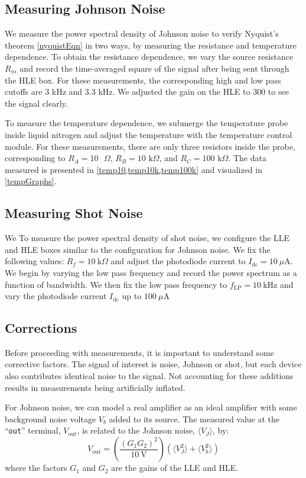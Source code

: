 \documentclass[12pt]{article}
\begin{document}
	\subsection{Measuring Johnson Noise}
	We measure the power spectral density of Johnson noise to verify Nyquist's theorem \cref{nyquistEqn} in two ways, by measuring the resistance and temperature dependence. To obtain the resistance dependence, we vary the source resistance $R_{in}$ and record the time-averaged square of the signal after being sent through the HLE box. For these measurements, the corresponding high and low pass cutoffs are $3$ kHz and $3.3$ kHz. We adjusted the gain on the HLE to 300 to see the signal clearly.
	
	To measure the temperature dependence, we submerge the temperature probe inside liquid nitrogen and adjust the temperature with the temperature control module. For these measurements, there are only three resistors inside the probe, corresponding to $R_A = 10 \text{ } \Omega$, $R_B = 10 \text{ k}\Omega$, and $R_C = 100 \text{ k}\Omega$. The data measured is presented in \cref{temp10,temp10k,temp100k} and visualized in \cref{tempGraphs}.
	
	\subsection{Measuring Shot Noise}
	We To measure the power spectral density of shot noise, we configure the LLE and HLE boxes similar to the configuration for Johnson noise. We fix the following values: $R_f = 10 \ \text{k}\Omega$ and adjust the photodiode current to $I_{\text{dc}} = 10 \ \mu \text{A}$. We begin by varying the low pass frequency and record the power spectrum as a function of bandwidth. We then fix the low pass frequency to $f_{\text{LP}} = 10 \ \text{kHz}$ and vary the photodiode current $I_{\text{dc}}$ up to $100 \ \mu \text{A}$
	
	\subsection{Corrections}
	Before proceeding with measurements, it is important to understand some corrective factors. The signal of interest is noise, Johnson or shot, but each device also contributes identical noise to the signal. Not accounting for these additions results in measurements being artificially inflated.
	
	For Johnson noise, we can model a real amplifier as an ideal amplifier with some background noise voltage $V_b$ added to its source. The measured value at the ``\texttt{out}'' terminal, $V_\text{out}$, is related to the Johnson noise, $\langle V_J \rangle$, by:
	\begin{equation}
		V_{\text{out}} = \left( \frac{(G_1 G_2)^2}{10 \ \text{V}} \right) \left( \langle V_J^2 \rangle + \langle V_b^2 \rangle \right)
	\end{equation} 
	where the factors $G_1$ and $G_2$ are the gains of the LLE and HLE.
	
\end{document}

